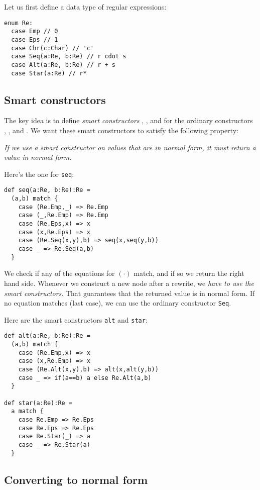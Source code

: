 Let us first define a data type of regular expressions:

\begin{lstlisting}
enum Re:
  case Emp // 0
  case Eps // 1
  case Chr(c:Char) // 'c'
  case Seq(a:Re, b:Re) // r cdot s
  case Alt(a:Re, b:Re) // r + s
  case Star(a:Re) // r*
\end{lstlisting}

\subsection{Smart constructors}

The key idea is to define \emph{smart constructors} , , and  for the ordinary constructors , , and . We want these smart constructors to satisfy the following property:

\emph{If we use a smart constructor on values that are in normal form, it must return a value in normal form.}

Here's the one for \lstinline|seq|:

\begin{lstlisting}
def seq(a:Re, b:Re):Re =
  (a,b) match {
    case (Re.Emp,_) => Re.Emp
    case (_,Re.Emp) => Re.Emp
    case (Re.Eps,x) => x
    case (x,Re.Eps) => x
    case (Re.Seq(x,y),b) => seq(x,seq(y,b))
    case _ => Re.Seq(a,b)
  }
\end{lstlisting}

We check if any of the equations for $(\cdot)$ match, and if so we return the right hand side. Whenever we construct a new node after a rewrite, we \emph{have to use the smart constructors}. That guarantees that the returned value is in normal form. If no equation matches (last case), we can use the ordinary constructor \lstinline|Seq|.

Here are the smart constructors \lstinline|alt| and \lstinline|star|:

\begin{lstlisting}
def alt(a:Re, b:Re):Re =
  (a,b) match {
    case (Re.Emp,x) => x
    case (x,Re.Emp) => x
    case (Re.Alt(x,y),b) => alt(x,alt(y,b))
    case _ => if(a==b) a else Re.Alt(a,b)
  }

def star(a:Re):Re =
  a match {
    case Re.Emp => Re.Eps
    case Re.Eps => Re.Eps
    case Re.Star(_) => a
    case _ => Re.Star(a)
  }
\end{lstlisting}

\subsection{Converting to normal form}

